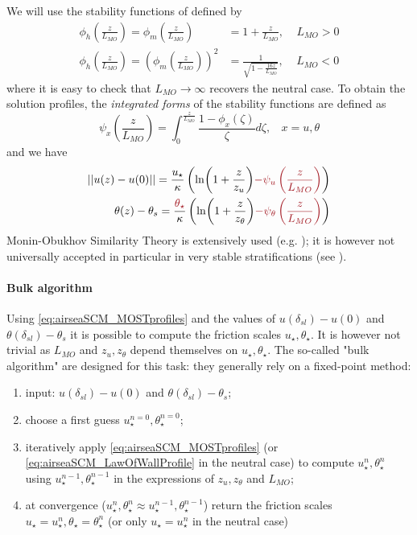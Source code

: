 We will use the stability functions of
\citep{hogstrom_non-dimensional_1988} defined by
\begin{equation}
\begin{aligned}
	\phi_h(\frac{z}{L_{MO}}) = \phi_m(\frac{z}{L_{MO}})
	&= 1+ \frac{z}{L_{MO}},
	~~~~~ L_{MO} > 0\\
	\phi_h(\frac{z}{L_{MO}}) =
	\left(\phi_m(\frac{z}{L_{MO}})\right)^2
	&= \frac{1}{\sqrt{1 - \frac{16 z}{L_{MO}}}},
	~~~~~L_{MO} < 0
\end{aligned}
\end{equation}
where it is easy to check that $L_{MO}\rightarrow \infty$
recovers the neutral case.
To obtain the solution profiles,
the \textit{integrated forms}
of the stability functions are defined as
\begin{equation}
	\psi_x \left(\frac{z}{L_{MO}}\right)
	= \int_0^{\frac{z}{L_{MO}}}
	\frac{1 - \phi_x(\zeta)}{\zeta} d\zeta
	, ~~~~x=u,\theta
\end{equation}
and we have
\begin{equation}
\label{eq:airseaSCM_MOSTprofiles}
\begin{aligned}
	||u(z)-u(0)|| = \frac{u_\star}{\kappa}
    \left(
	\ln(1+\frac{z}{z_{u}})
	\emphase{- \psi_u\left(\frac{z}{L_{MO}}\right)}
    \right)
    \\
    \theta(z) - \theta_s = 
	\frac{\emphase{\theta_\star}}{\kappa}
    \left(
	\ln(1+\frac{z}{z_{\theta}})
	\emphase{- \psi_\theta\left(\frac{z}{L_{MO}}\right)}
\right)
\end{aligned}
\end{equation}
Monin-Obukhov Similarity Theory
is extensively used (e.g. \citep{basu_cautionary_2017});
it is however not universally
accepted in particular in very stable stratifications
(see \citep{optis_moving_2014}).
\paragraph{Bulk algorithm}
Using \eqref{eq:airseaSCM_MOSTprofiles} and the values of
$u(\delta_{sl}) - u(0)$ and $\theta(\delta_{sl}) - \theta_s$
it is possible to compute the friction scales
$u_\star, \theta_\star$. It is however not trivial as
$L_{MO}$ and $z_u, z_\theta$ depend themselves on
$u_\star, \theta_\star$.
The so-called "bulk algorithm" are designed for this
task: they generally rely on a fixed-point method:
\begin{enumerate}
\item input: $u(\delta_{sl}) - u(0)$
		and $\theta(\delta_{sl}) - \theta_s$;
\item choose a first guess $u_\star^{n=0}, \theta_\star^{n=0}$;
\item iteratively apply
	\eqref{eq:airseaSCM_MOSTprofiles} (or
	\eqref{eq:airseaSCM_LawOfWallProfile} in the neutral case)
	to compute $u_\star^{n}, \theta_\star^{n}$ using
	$u_\star^{n-1}, \theta_\star^{n-1}$
	in the expressions of $z_u, z_\theta$ and $L_{MO}$;
\item at convergence ($u_\star^{n},\theta_\star^{n} \approx
	u_\star^{n-1},\theta_\star^{n-1}$) return the friction
		scales $u_\star = u_\star^{n},
		\theta_\star = \theta_\star^{n}$ (or only
		$u_\star = u_\star^{n}$ in the neutral case)
\end{enumerate}
